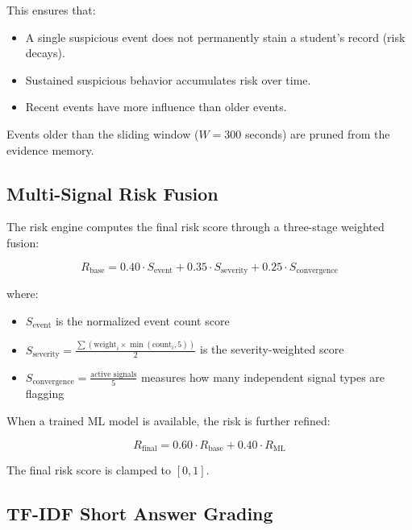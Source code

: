 \documentclass{article}
\begin{document}
This ensures that:
\begin{itemize}
    \item A single suspicious event does not permanently stain a student's record (risk decays).
    \item Sustained suspicious behavior accumulates risk over time.
    \item Recent events have more influence than older events.
\end{itemize}

Events older than the sliding window ($W = 300$ seconds) are pruned from the evidence memory.

\subsection{Multi-Signal Risk Fusion}

The risk engine computes the final risk score through a three-stage weighted fusion:

\begin{equation}
    R_{\text{base}} = 0.40 \cdot S_{\text{event}} + 0.35 \cdot S_{\text{severity}} + 0.25 \cdot S_{\text{convergence}}
    \label{eq:risk_base}
\end{equation}

where:
\begin{itemize}
    \item $S_{\text{event}}$ is the normalized event count score
    \item $S_{\text{severity}} = \frac{\sum(\text{weight}_i \times \min(\text{count}_i, 5))}{2}$ is the severity-weighted score
    \item $S_{\text{convergence}} = \frac{\text{active signals}}{5}$ measures how many independent signal types are flagging
\end{itemize}

When a trained ML model is available, the risk is further refined:

\begin{equation}
    R_{\text{final}} = 0.60 \cdot R_{\text{base}} + 0.40 \cdot R_{\text{ML}}
    \label{eq:risk_final}
\end{equation}

The final risk score is clamped to $[0, 1]$.

\subsection{TF-IDF Short Answer Grading}
\end{document}
